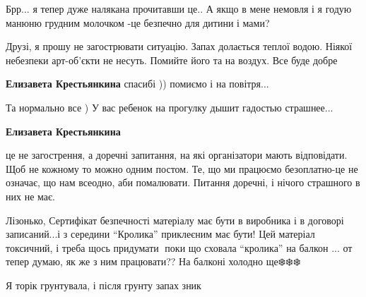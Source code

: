 
Брр... я тепер дуже налякана прочитавши це.. А якщо в мене немовля і я годую
манюню грудним молочком -це безпечно для дитини і мами?

\begin{itemize} %

Друзі, я прошу не загострювати ситуацію. Запах долається теплої водою. Ніякої
небезпеки арт-об'єкти не несуть. Помийте його та на воздух. Все буде добре

\textbf{Елизавета Крестьянкина} спасибі )) помиємо і на повітря...


Та нормально все ) У вас ребенок на прогулку дышит гадостью страшнее...

\textbf{Елизавета Крестьянкина} 

це не загострення, а доречні запитання, на які організатори мають відповідати.
Щоб не кожному то можно одним постом. Те, що ми працюємо безоплатно-це не
означає, що нам всеодно, аби помалювати. Питання доречні, і нічого страшного в
них не має.

\end{itemize} %


Лізонько, Сертифікат безпечності матеріалу має бути в виробника і в договорі
записаний...і з середини \enquote{Кролика} приклеєним має бути! Цей матеріал
токсичний, і треба щось придумати🐰 поки що сховала \enquote{кролика} на балкон ... от
тепер думаю, як же з ним працювати?? На балконі холодно ще❄️❄️❄️


Я торік грунтувала, і після грунту запах зник
